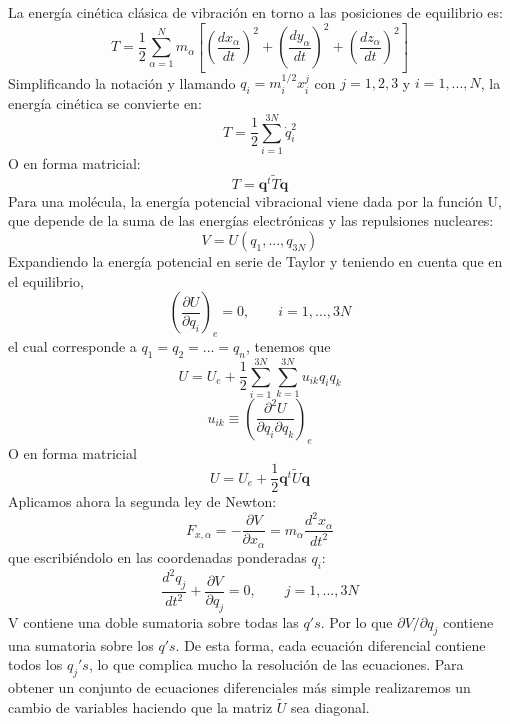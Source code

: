 \documentclass[a4paper]{article}
\begin{document}
La energía cinética clásica de vibración en torno a las posiciones de equilibrio es:
\begin{equation}
T= \frac{1}{2}\sum_{\alpha = 1}^Nm_\alpha\left[\left(\frac{dx_\alpha}{dt}\right)^2+\left(\frac{dy_\alpha}{dt}\right)^2+\left(\frac{dz_\alpha}{dt}\right)^2\right]
\end{equation}
Simplificando la notación y llamando $q_i=m_i^{1/2}x_i^j$ con $j=1,2,3$ y $i=1,...,N$, la energía cinética se convierte en:
\begin{equation}
T=\frac{1}{2}\sum_{i=1}^{3N}\dot q_i^2
\end{equation}
O en forma matricial:
\begin{equation}
T=\boldsymbol q^t\tilde T\boldsymbol q
\end{equation}
Para una molécula, la energía potencial vibracional viene dada por la función U, que depende de la suma de las energías electrónicas y las repulsiones nucleares:
\begin{equation}
V=U(q_1,...,q_{3N})
\end{equation}
Expandiendo la energía potencial en serie de Taylor y teniendo en cuenta que en el equilibrio,
\begin{equation}
\left(\frac{\partial U}{\partial q_i}\right)_e=0, \qquad i= 1,...,3N
\end{equation}
el cual corresponde a $q_1=q_2=...=q_n$, tenemos que
\begin{equation}
U = U_e + \frac{1}{2}\sum_{i=1}^{3N}\sum_{k=1}^{3N}u_{ik}q_iq_k
\end{equation}
\begin{equation}
u_{ik} \equiv \left(\frac{\partial^2U}{\partial q_i \partial q_k}\right)_e
\end{equation}
O en forma matricial
\begin{equation}
U=U_e+\frac{1}{2}\boldsymbol q^t\tilde U\boldsymbol q
\end{equation}
Aplicamos ahora la segunda ley de Newton:
\begin{equation}
F_{x,\alpha}=-\frac{\partial V}{\partial x_\alpha}=m_\alpha\frac{d^2x_\alpha}{dt^2}
\end{equation}
que escribiéndolo en las coordenadas ponderadas $q_i$:
\begin{equation}
\frac{d^2q_j}{dt^2}+\frac{\partial V}{\partial q_j}= 0, \qquad j=1,...,3N
\end{equation}
V contiene una doble sumatoria sobre todas las $q's$. Por lo que $\partial V/\partial q_j$ contiene una sumatoria sobre los $q's$. De esta forma, cada ecuación diferencial contiene todos los $q_j's$, lo que complica mucho la resolución de las ecuaciones. Para obtener un conjunto de ecuaciones diferenciales más simple realizaremos un cambio de variables haciendo que la matriz $\tilde U$ sea diagonal.
\end{document}
